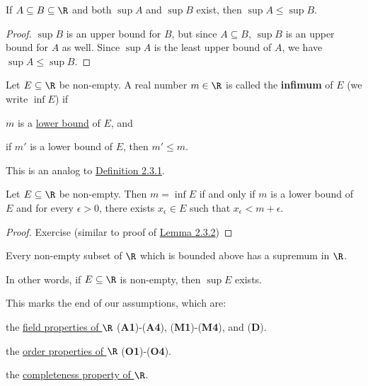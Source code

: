 \label{cd8e7c5}

If $A\subseteq B\subseteq\R$ and both $\sup A$ and $\sup B$ exist, then $\sup
A\leq\sup B$.

\begin{proof}
  $\sup B$ is an upper bound for $B$, but since $A\subseteq B$, $\sup B$ is an
  upper bound for $A$ as well. Since $\sup A$ is the least upper bound of $A$,
  we have $\sup A\leq\sup B$.
\end{proof}

\label{ff16df6}

Let $E\subseteq\R$ be non-empty. A real number $m\in\R$ is called the
\textbf{infimum} of $E$ (we write $\inf E$) if
\begin{enumerati}
  \item $m$ is a \href{e4698be}{lower bound} of $E$, and
  \item if $m'$ is a lower bound of $E$, then $m'\leq m$.
\end{enumerati}

This is an analog to \href{e6981e1}{Definition 2.3.1}.

\label{fec9bdb}

Let $E\subseteq\R$ be non-empty. Then $m=\inf E$ if and only if $m$ is a lower
bound of $E$ and for every $\epsilon>0$, there exists $x_\epsilon\in E$ such
that $x_\epsilon<m+\epsilon$.

\begin{proof}
  Exercise (similar to proof of \href{f77f162}{Lemma 2.3.2})
\end{proof}

\label{f330cf9}

Every non-empty subset of $\R$ which is bounded above has a supremum in $\R$.

In other words, if $E\subseteq\R$ is non-empty, then $\sup E$ exists.

\label{b1dc879}

This marks the end of our assumptions, which are:

\begin{enumerati}
  \item the \href{bf61f02}{field properties of $\R$} (\textbf{A1})-(\textbf{A4}),
  (\textbf{M1})-(\textbf{M4}), and (\textbf{D}).
  \item the \href{d49c63e}{order properties of $\R$} (\textbf{O1})-(\textbf{O4}).
  \item the \href{f330cf9}{completeness property of $\R$}.
\end{enumerati}

